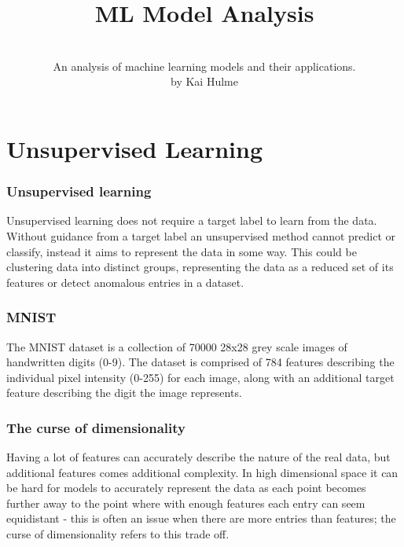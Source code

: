 \documentclass[11pt]{article}
\title{ML Model Analysis}
\author{
      \\
    An analysis of machine learning models and their applications. \\
    by Kai Hulme \\ 
}
\begin{document}
\maketitle
\newpage


\section{Unsupervised Learning}
\label{analysing_mnist}

\subsubsection{Unsupervised learning}

Unsupervised learning does not require a target label to learn from the data. Without guidance from a target label an unsupervised method cannot predict or classify, instead it aims to represent the data in some way. This could be clustering data into distinct groups, representing the data as a reduced set of its features or detect anomalous entries in a dataset. 

\subsubsection{MNIST}

The MNIST dataset is a collection of 70000 28x28 grey scale images of handwritten digits (0-9). The dataset is comprised of 784 features describing the individual pixel intensity (0-255) for each image, along with an additional target feature describing the digit the image represents.

\subsubsection{The curse of dimensionality}

Having a lot of features can accurately describe the nature of the real data, but additional features comes additional complexity. In high dimensional space it can be hard for models to accurately represent the data as each point becomes further away to the point where with enough features each entry can seem equidistant - this is often an issue when there are more entries than features; the curse of dimensionality refers to this trade off.
\end{document}
